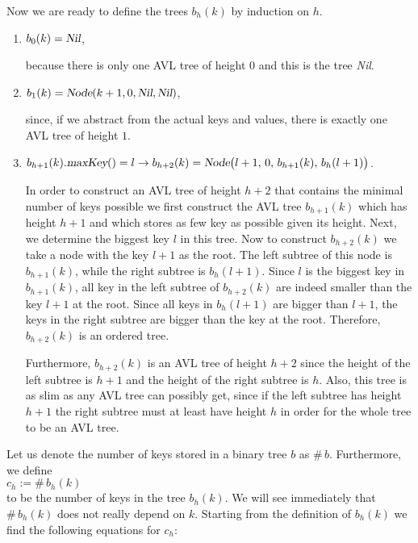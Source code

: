 Now we are ready to define the trees  $b_h(k)$ by induction on  $h$.
\begin{enumerate}
\item $b_0(k) = \textsl{Nil}$,

      because there is only one AVL tree of height $0$ and this is the tree \textsl{Nil}.
\item $b_1(k) = \textsl{Node}(k+1,0,\textsl{Nil}, \textsl{Nil})$,

      since, if we abstract from the actual keys and values, there is exactly one AVL tree of height
      $1$.
\item $b_{h+1}(k).\textsl{maxKey}() = l \rightarrow 
       b_{h+2}(k) = \textsl{Node}\bigl(l+1,\,0,\,b_{h+1}(k),\,b_h(l+1)\bigr)$.

      In order to construct an AVL tree of height $h+2$ that contains the minimal number of keys 
      possible we first construct the AVL tree $b_{h+1}(k)$ which has height  $h+1$ and which stores as few
      key as possible given its height.  Next, we determine the biggest key $l$ in this tree. 
      Now to construct $b_{h+2}(k)$ we take a node with the key $l+1$ as the root.
      The left subtree of this node is $b_{h+1}(k)$, while the right subtree is $b_h(l+1)$.
      Since $l$ is the biggest key in $b_{h+1}(k)$, all key in the left subtree of
      $b_{h+2}(k)$ are indeed smaller than the key $l+1$ at the root.  Since all keys in
      $b_h(l+1)$ are bigger than $l+1$, the keys in the right subtree are bigger than the key at the
      root.  Therefore, $b_{h+2}(k)$ is an ordered tree.

      Furthermore, $b_{h+2}(k)$ is an AVL tree of height $h+2$ since the height of the left subtree
      is $h+1$ and the height of the right subtree is $h$.  Also, this tree is as slim as
      any AVL tree can possibly get, since if the left subtree has height $h+1$ the right subtree
      must at least have height $h$ in order for the whole tree to be an AVL tree.
\end{enumerate}
Let us denote the number of keys stored in a binary tree $b$ as  $\#\,b$.  Furthermore, we define
\\[0.2cm]
\hspace*{1.3cm}
$c_h := \#\, b_h(k)$
\\[0.2cm]
to be the number of keys in the tree $b_h(k)$.  We will see immediately that 
$\#\,b_h(k)$ does not really depend on  $k$.  Starting from the definition of $b_h(k)$ we find the
following equations for $c_h$:
